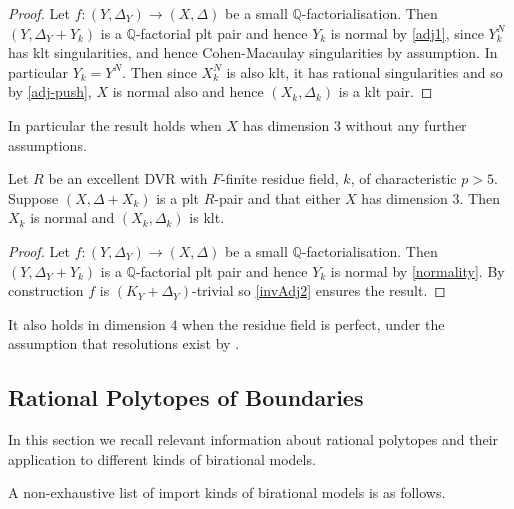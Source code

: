 \documentclass[a4paper,12pt]{book}
\begin{document}
\begin{proof}
	
	Let $f\colon (Y,\Delta_{Y})\to (X,\Delta)$ be a small $\mathbb{Q}$-factorialisation. Then $(Y,\Delta_{Y}+Y_{k})$ is a $\mathbb{Q}$-factorial plt pair and hence $Y_{k}$ is normal by \autoref{adj1}, since $Y_{k}^{N}$ has klt singularities, and hence Cohen-Macaulay singularities by assumption. In particular $Y_{k}=Y^{N}$. Then since $X_{k}^{N}$ is also klt, it has rational singularities and so by \autoref{adj-push}, $X$ is normal also and hence $(X_{k},\Delta_{k})$ is a klt pair.
	
\end{proof}

In particular the result holds when $X$ has dimension $3$ without any further assumptions.
 

\begin{corollary}\label{invAdj3}
	Let $R$ be an excellent DVR with $F$-finite residue field, $k$, of characteristic $p> 5$.	Suppose $(X,\Delta+X_{k})$ is a plt $R$-pair and that either $X$ has dimension $3$. Then $X_{k}$ is normal and $(X_{k}, \Delta_{k})$ is klt.
\end{corollary}

\begin{proof}
	Let $f\colon (Y,\Delta_{Y})\to (X,\Delta)$ be a small $\mathbb{Q}$-factorialisation. Then $(Y,\Delta_{Y}+Y_{k})$ is a $\mathbb{Q}$-factorial plt pair and hence $Y_{k}$ is normal by \autoref{normality}. By construction $f$ is $(K_{Y}+\Delta_{Y})$-trivial so \autoref{invAdj2} ensures the result.
\end{proof}

It also holds in dimension $4$ when the residue field is perfect, under the assumption that resolutions exist by \cite{}.

\subsection{Rational Polytopes of Boundaries}

In this section we recall relevant information about rational polytopes and their application to different kinds of birational models.

A non-exhaustive list of import kinds of birational models is as follows.
\end{document}
